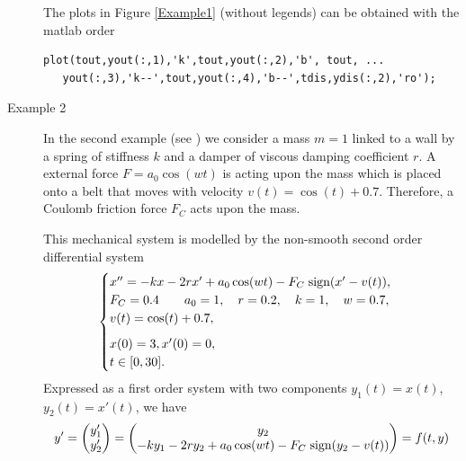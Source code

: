 \documentclass{article}
\begin{document}
\begin{description}
The plots in Figure \ref{Example1} (without legends) can be obtained with the matlab order

\begin{verbatim}
plot(tout,yout(:,1),'k',tout,yout(:,2),'b', tout, ...
   yout(:,3),'k--',tout,yout(:,4),'b--',tdis,ydis(:,2),'ro');
\end{verbatim}

\item[Example 2]
In the second example (see \cite{Luo}) we consider a mass $m=1$ linked to a
wall by a spring of stiffness $k$
and a damper of viscous damping coefficient $r$. A external force $F=a_0 \cos(wt)$ is acting
upon the mass which is placed onto a belt that moves with velocity $v(t)= \cos(t) + 0.7$.
Therefore, a Coulomb friction force $F_C$ acts upon the mass.

\begin{center}
\end{center}

This mechanical system is modelled by the non-smooth second order differential system
\[
\begin{cases}
x''  = -k x - 2 r x'+ a_0 \cos(w t) - F_C\; \hbox{sign}(x' - v(t) ),  & \\
F_C=0.4
\qquad
a_0=1, \quad r=0.2, \quad k=1, \quad w=0.7,
\\
v(t)=\cos (t) + 0.7,\\
x(0) = 3, x'(0)=0,  \vrule width 0pt height 16pt \\
t\in[0,30].
\end{cases}
\]
Expressed as a first order system with
two components $y_1(t)=x(t)$, $y_2(t)=x'(t)$, we have
\[
y'=\begin{pmatrix} y_1' \\y'_2 \end{pmatrix}=
\begin{pmatrix} y_2 \\ -k y_1 - 2 r y_2+ a_0 \cos(w t) - F_C\; \hbox{sign}(y_2 - v(t) )
\end{pmatrix} = f(t,y)
\]


\end{description}
\end{document}
